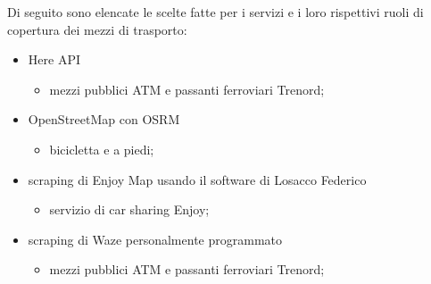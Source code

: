 Di seguito sono elencate le scelte fatte per i servizi e i loro rispettivi ruoli di copertura dei mezzi di trasporto:

\begin{itemize}
	\item Here API
	\begin{itemize}
		\item mezzi pubblici ATM e passanti ferroviari Trenord;
	\end{itemize}

	\item OpenStreetMap con OSRM
	\begin{itemize}
		\item bicicletta e a piedi;
	\end{itemize}

	\item scraping di Enjoy Map usando il software di Losacco Federico \cite{trentini2017sampling}
	\begin{itemize}
		\item servizio di car sharing Enjoy;
	\end{itemize}

	\item scraping di Waze personalmente programmato
	\begin{itemize}
		\item mezzi pubblici ATM e passanti ferroviari Trenord;
	\end{itemize}
\end{itemize}
